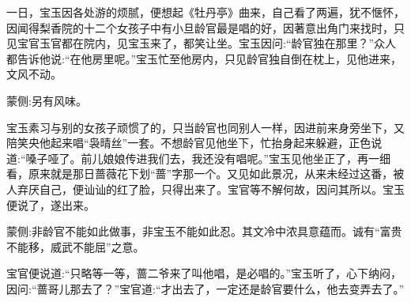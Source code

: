 

\begin{parag}
    一日，宝玉因各处游的烦腻，便想起《牡丹亭》曲来，自己看了两遍，犹不惬怀，因闻得梨香院的十二个女孩子中有小旦龄官最是唱的好，因著意出角门来找时，只见宝官玉官都在院内，见宝玉来了，都笑让坐。宝玉因问:“龄官独在那里？”众人都告诉他说:“在他房里呢。”宝玉忙至他房内，只见龄官独自倒在枕上，见他进来，文风不动。\begin{note}蒙侧:另有风味。\end{note}宝玉素习与别的女孩子顽惯了的，只当龄官也同别人一样，因进前来身旁坐下，又陪笑央他起来唱“袅晴丝”一套。不想龄官见他坐下，忙抬身起来躲避，正色说道:“嗓子哑了。前儿娘娘传进我们去，我还没有唱呢。”宝玉见他坐正了，再一细看，原来就是那日蔷薇花下划“蔷”字那一个。又见如此景况，从来未经过这番，被人弃厌自己，便讪讪的红了脸，只得出来了。宝官等不解何故，因问其所以。宝玉便说了，遂出来。\begin{note}蒙侧:非龄官不能如此做事，非宝玉不能如此忍。其文冷中浓具意蕴而。诚有“富贵不能移，威武不能屈”之意。\end{note}宝官便说道:“只略等一等，蔷二爷来了叫他唱，是必唱的。”宝玉听了，心下纳闷，因问:“蔷哥儿那去了？”宝官道:“才出去了，一定还是龄官要什么，他去变弄去了。”
\end{parag}


